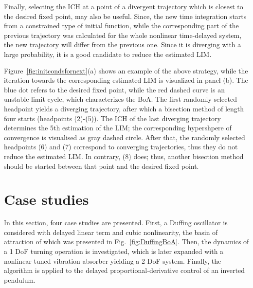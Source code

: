 \documentclass[preprint,12pt]{elsarticle}
\begin{document}
	Finally, selecting the ICH at a point of a divergent trajectory which is closest to the desired fixed point, may also be useful. Since, the new time integration starts from a constrained type of initial function, while the corresponding part of the previous trajectory was calculated for the whole nonlinear time-delayed system, the new trajectory will differ from the previous one. Since it is diverging with a large probability, it is a good candidate to reduce the estimated LIM.
	
	Figure~\ref{fig:initcondsfornext}(a) shows an example  of the above strategy, while the iteration towards the corresponding estimated LIM is visualized in panel (b). The blue dot refers to the desired fixed point, while the red dashed curve is an unstable limit cycle, which characterizes the BoA. The first randomly selected headpoint yields a diverging trajectory, after which a bisection method of length four starts (headpoints (2)-(5)). The ICH of the last diverging trajectory determines the 5th estimation of the LIM; the corresponding hypershpere of convergence is visualised as gray dashed circle. After that, the randomly selected headpoints (6) and (7) correspond to converging trajectories, thus they do not reduce the estimated LIM. In contrary, (8) does; thus, another bisection method should be started between that point and the desired fixed point.
	
	
	
	\section{Case studies}\label{sec:casestudies}
	
	In this section, four case studies are presented. First, a Duffing oscillator is considered with delayed linear term and cubic nonlinearity, the basin of attraction of which was presented in Fig.~\ref{fig:DuffingBoA}. Then, the dynamics of a 1 DoF turning operation is investigated, which is later expanded with a nonlinear tuned vibration absorber yielding a 2 DoF system. Finally, the algorithm is applied to the delayed proportional-derivative control of an inverted pendulum.
	
\end{document}
